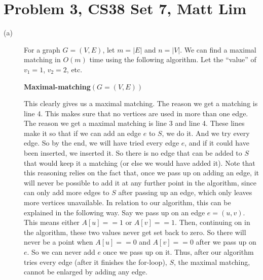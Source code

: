 \documentclass{article}
\begin{document}
\section*{Problem 3, CS38 Set 7, Matt Lim}
\begin{description}
    \item[(a)]
        For a graph $G = (V,E)$, let $m = |E|$ and $n = |V|$.
        We can find a maximal matching in $O(m)$ time using the following
        algorithm. Let the ``value'' of $v_1 = 1$, $v_2 = 2$, etc.

        \vspace{5mm}
        \noindent \textbf{Maximal-matching}$(G = (V,E))$

        This clearly gives us a maximal matching. The reason we get a
        matching is line 4. This makes sure that no vertices are used
        in more than one edge. The reason we get a maximal matching is
        line 3 and line 4. These lines make it so that if we can add an edge $e$
        to $S$, we do it. And we try every edge. So by the end, we will have
        tried every edge $e$, and if it could have been inserted, we inserted it. So
        there is no edge that can be added to $S$ that would keep it a matching
        (or else we would have added it). Note that this reasoning relies on the fact
        that, once we pass up on adding an edge, it will never be possible to add
        it at any further point in the algorithm, since can only add more edges
        to $S$ after passing up an edge, which only leaves more vertices
        unavailable. In relation to our algorithm, this can be explained in the
        following way. Say we pass up on an edge $e = (u,v)$. This means either
        $A[u] == 1$ or $A[v] == 1$. Then, continuing on in the algorithm, these
        two values never get set back to zero. So there will never be a point
        when $A[u] == 0$ and $A[v] == 0$ after we pass up on $e$. So we can
        never add $e$ once we pass up on it. Thus, after our algorithm tries
        every edge (after it finishes the for-loop), $S$, the maximal matching,
        cannot be enlarged by adding any edge.


\end{description}
\end{document}
